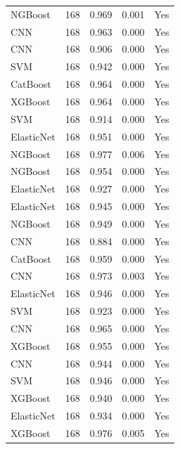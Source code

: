 \begin{table}
\begin{tabular}{lrrrr}
   NGBoost & 168 &        0.969 &     0.001 &                Yes \\
       CNN & 168 &        0.963 &     0.000 &                Yes \\
       CNN & 168 &        0.906 &     0.000 &                Yes \\
       SVM & 168 &        0.942 &     0.000 &                Yes \\
  CatBoost & 168 &        0.964 &     0.000 &                Yes \\
   XGBoost & 168 &        0.964 &     0.000 &                Yes \\
       SVM & 168 &        0.914 &     0.000 &                Yes \\
ElasticNet & 168 &        0.951 &     0.000 &                Yes \\
   NGBoost & 168 &        0.977 &     0.006 &                Yes \\
   NGBoost & 168 &        0.954 &     0.000 &                Yes \\
ElasticNet & 168 &        0.927 &     0.000 &                Yes \\
ElasticNet & 168 &        0.945 &     0.000 &                Yes \\
   NGBoost & 168 &        0.949 &     0.000 &                Yes \\
       CNN & 168 &        0.884 &     0.000 &                Yes \\
  CatBoost & 168 &        0.959 &     0.000 &                Yes \\
       CNN & 168 &        0.973 &     0.003 &                Yes \\
ElasticNet & 168 &        0.946 &     0.000 &                Yes \\
       SVM & 168 &        0.923 &     0.000 &                Yes \\
       CNN & 168 &        0.965 &     0.000 &                Yes \\
   XGBoost & 168 &        0.955 &     0.000 &                Yes \\
       CNN & 168 &        0.944 &     0.000 &                Yes \\
       SVM & 168 &        0.946 &     0.000 &                Yes \\
   XGBoost & 168 &        0.940 &     0.000 &                Yes \\
ElasticNet & 168 &        0.934 &     0.000 &                Yes \\
   XGBoost & 168 &        0.976 &     0.005 &                Yes \\

\end{tabular}
\end{table}
